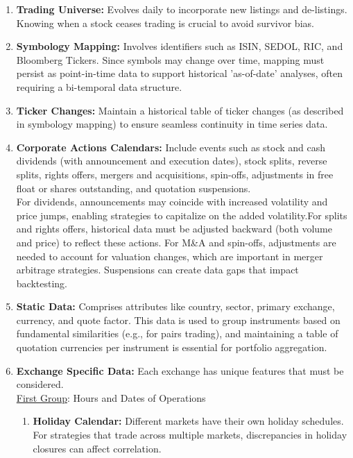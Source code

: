 \begin{definition} 
\begin{enumerate}[label=\roman*.]
\setlength{\itemsep}{0pt}
\item \textbf{Trading Universe:} Evolves daily to incorporate new listings and de-listings. Knowing when a stock ceases trading is crucial to avoid survivor bias.
\item \textbf{Symbology Mapping:} Involves identifiers such as ISIN, SEDOL, RIC, and Bloomberg Tickers. Since symbols may change over time, mapping must persist as point-in-time data to support historical 'as-of-date' analyses, often requiring a bi-temporal data structure.
\item \textbf{Ticker Changes:} Maintain a historical table of ticker changes (as described in symbology mapping) to ensure seamless continuity in time series data.
\item \textbf{Corporate Actions Calendars:} Include events such as stock and cash dividends (with announcement and execution dates), stock splits, reverse splits, rights offers, mergers and acquisitions, spin-offs, adjustments in free float or shares outstanding, and quotation suspensions.\\
For dividends, announcements may coincide with increased volatility and price jumps, enabling strategies to capitalize on the added volatility.For splits and rights offers, historical data must be adjusted backward (both volume and price) to reflect these actions. For M\&A and spin-offs, adjustments are needed to account for valuation changes, which are important in merger arbitrage strategies. Suspensions can create data gaps that impact backtesting.
\item \textbf{Static Data:} Comprises attributes like country, sector, primary exchange, currency, and quote factor. This data is used to group instruments based on fundamental similarities (e.g., for pairs trading), and maintaining a table of quotation currencies per instrument is essential for portfolio aggregation.
\item \textbf{Exchange Specific Data:} Each exchange has unique features that must be considered. \\
\underline{First Group}: Hours and Dates of Operations
\begin{enumerate}[label=\arabic*.]
\setlength{\itemsep}{0pt}
\item \textbf{Holiday Calendar:} Different markets have their own holiday schedules. For strategies that trade across multiple markets, discrepancies in holiday closures can affect correlation.

\end{enumerate}
\end{enumerate}
\end{definition}
